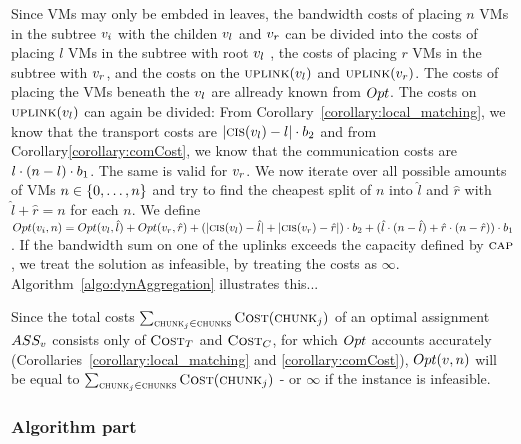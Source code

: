 Since VMs may only be embded in leaves, the bandwidth costs of placing $n$ VMs 
in the subtree $v_i$ with the childen $v_l$ and 
$v_r$ can be divided into the costs of placing $l$ VMs in the 
subtree with root $v_l$ , the costs of placing 
$r$ VMs in the subtree with $v_r$, and the costs on the 
$\textsc{uplink}(v_l)$ and $\textsc{uplink}(v_r)$. The costs of 
placing the VMs beneath the $v_l$ are allready known from 
$Opt$.  
The costs on $\textsc{uplink}(v_l)$ can again be divided: From 
Corollary~\ref{corollary:local_matching}, we know that the transport costs are 
 $|\textsc{cis}(v_l) - l| \cdot b_2$ and from 
Corollary\ref{corollary:comCost}, we know that the communication costs are 
$l\cdot (n - l) \cdot b_1$. The same is valid for $v_r$. 
We now iterate over all possible amounts of VMs $n \in \{0,\dots,n\}$ and 
try to find the cheapest split of $n$ into $\hat l$ and $\hat r$ with 
$\hat l + \hat r = n$ for each $n$. We define $Opt(v_i, n) = 
Opt(v_{l}, \hat l) + Opt(v_{r}, \hat r) + 
(|\textsc{cis}(v_{l}) - \hat 
l|+|\textsc{cis}(v_{r}) - \hat r|) \cdot b_2 + (\hat 
l\cdot (n - \hat l) + \hat r\cdot (n - \hat r)) \cdot b_1$. If the 
bandwidth sum on one of the uplinks exceeds the capacity defined by 
$\textsc{cap}$, we treat the solution as infeasible, by treating the costs as
$\infty$. Algorithm~\ref{algo:dynAggregation} illustrates this... 

Since the total costs $\sum_{\textsc{chunk}_j \in 
\textsc{chunks}}\textsc{Cost}(\textsc{chunk}_j)$ of an optimal assignment $ASS_v$ 
consists only of $\textsc{Cost}_T$ and $\textsc{Cost}_C$, for which $Opt$ accounts accurately 
(Corollaries~\ref{corollary:local_matching} and \ref{corollary:comCost}), 
$Opt(v, n)$ will be equal to $\sum_{\textsc{chunk}_j \in 
\textsc{chunks}}\textsc{Cost}(\textsc{chunk}_j)$ - or $\infty$ if the instance is infeasible.


\subsubsection{Algorithm part}

